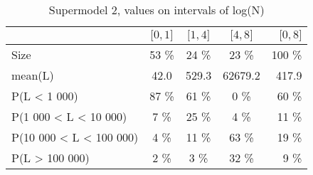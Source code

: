 \documentclass[numbered]{CSL}
\begin{document}
\setlength{\tabcolsep}{0.5em}
\begin{table}
\centering
\caption{Supermodel 2, values on intervals of log(N) \label{table:NSupermodel2}}
\begin{tabular}{l|ccc|r}
\toprule
{} & \small{$\lbrack 0, 1 \rbrack$} & \small{$\lbrack 1, 4 \rbrack$} & \small{$\lbrack 4, 8 \rbrack$} & \small{$\lbrack 0, 8 \rbrack$} \\
\midrule
Size                    &               53 \% &               24 \% &               23 \% &              100 \% \\
mean(L)                 &               42.0 &              529.3 &            62679.2 &              417.9 \\
P(L < 1 000)            &               87 \% &               61 \% &                0 \% &               60 \% \\
P(1 000 < L < 10 000)   &                7 \% &               25 \% &                4 \% &               11 \% \\
P(10 000 < L < 100 000) &                4 \% &               11 \% &               63 \% &               19 \% \\
P(L > 100 000)          &                2 \% &                3 \% &               32 \% &                9 \% \\
\bottomrule
\end{tabular}
\end{table}
\end{document}
